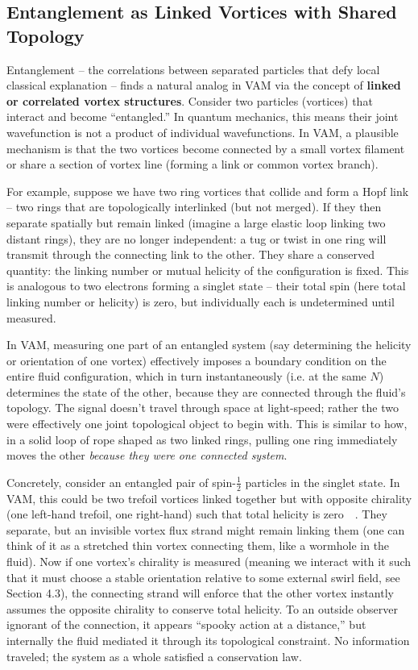 \documentclass[preprint]{revtex4-2}
\begin{document}
    \subsection{Entanglement as Linked Vortices with Shared Topology}
    Entanglement – the correlations between separated particles that defy local classical explanation – finds a natural analog in VAM via the concept of \textbf{linked or correlated vortex structures}. Consider two particles (vortices) that interact and become “entangled.” In quantum mechanics, this means their joint wavefunction is not a product of individual wavefunctions. In VAM, a plausible mechanism is that the two vortices become connected by a small vortex filament or share a section of vortex line (forming a link or common vortex branch).

    For example, suppose we have two ring vortices that collide and form a Hopf link – two rings that are topologically interlinked (but not merged). If they then separate spatially but remain linked (imagine a large elastic loop linking two distant rings), they are no longer independent: a tug or twist in one ring will transmit through the connecting link to the other. They share a conserved quantity: the linking number or mutual helicity of the configuration is fixed. This is analogous to two electrons forming a singlet state – their total spin (here total linking number or helicity) is zero, but individually each is undetermined until measured.

    In VAM, measuring one part of an entangled system (say determining the helicity or orientation of one vortex) effectively imposes a boundary condition on the entire fluid configuration, which in turn instantaneously (i.e. at the same $N$) determines the state of the other, because they are connected through the fluid’s topology. The signal doesn’t travel through space at light-speed; rather the two were effectively one joint topological object to begin with. This is similar to how, in a solid loop of rope shaped as two linked rings, pulling one ring immediately moves the other \emph{because they were one connected system}.

    Concretely, consider an entangled pair of spin-$\frac{1}{2}$ particles in the singlet state. In VAM, this could be two trefoil vortices linked together but with opposite chirality (one left-hand trefoil, one right-hand) such that total helicity is zero~\cite{reference_102}~\cite{reference_103}. They separate, but an invisible vortex flux strand might remain linking them (one can think of it as a stretched thin vortex connecting them, like a wormhole in the fluid). Now if one vortex’s chirality is measured (meaning we interact with it such that it must choose a stable orientation relative to some external swirl field, see Section 4.3), the connecting strand will enforce that the other vortex instantly assumes the opposite chirality to conserve total helicity. To an outside observer ignorant of the connection, it appears “spooky action at a distance,” but internally the fluid mediated it through its topological constraint. No information traveled; the system as a whole satisfied a conservation law.
\end{document}
